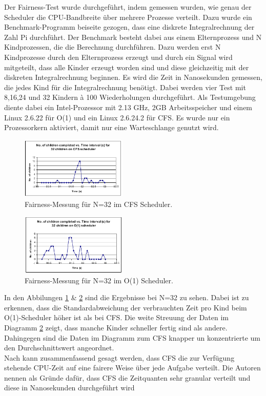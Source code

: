 Der Fairness-Test wurde durchgeführt, indem gemessen wurden, wie genau der Scheduler die CPU-Bandbreite über mehrere Prozesse verteilt. Dazu wurde ein Benchmark-Programm beiseite gezogen, dass eine diskrete Integralrechnung der Zahl Pi durchführt. Der Benchmark besteht dabei aus einem Elternprozess und N Kindprozessen, die die Berechnung durchführen. Dazu werden erst N Kindprozesse durch den Elternprozess erzeugt und durch ein Signal wird mitgeteilt, dass alle Kinder erzeugt worden sind und diese gleichzeitig mit der diskreten Integralrechnung beginnen. Es wird die Zeit in Nanosekunden gemessen, die jedes Kind für die Integralrechnung benötigt. Dabei werden vier Test mit 8,16,24 und 32 Kindern à 100 Wiederholungen durchgeführt. Als Testumgebung diente dabei ein Intel-Prozessor mit 2.13 GHz, 2GB Arbeitsspeicher und einem Linux 2.6.22 für O(1) und ein Linux 2.6.24.2 für CFS. Es wurde nur ein Prozessorkern aktiviert, damit nur eine Warteschlange genutzt wird.  
\begin{figure} [h]
	\centering
	\includegraphics[width=0.45\textwidth]{pictures/fairness_32_cfs.png}
	\caption{Fairness-Messung für N=32 im CFS Scheduler.}
	\label{fig:fair_meas_cfs}
\end{figure}
\begin{figure} [h]
 	\centering
 	\includegraphics[width=0.45\textwidth]{pictures/fairness_32_O1.png}
 	\caption{Fairness-Messung für N=32 im O(1) Scheduler.}
 	\label{fig:fair_meas_o1}
\end{figure}

In den Abbilungen \ref{fig:fair_meas_cfs} \& \ref{fig:fair_meas_o1} sind die Ergebnisse bei N=32 zu sehen. Dabei ist zu erkennen, dass die Standardabweichung der verbrauchten Zeit pro Kind beim O(1)-Scheduler höher ist als bei CFS. Die weite Streuung der Daten im Diagramm \ref{fig:fair_meas_o1} zeigt, dass manche Kinder schneller fertig sind als andere. Dahingegen sind die Daten im Diagramm zum CFS knapper un konzentrierte um den Durchschnittswert angeordnet. \\
Nach \cite{papercomparison} kann zusammenfassend gesagt werden, dass CFS die zur Verfügung stehende CPU-Zeit auf eine fairere Weise über jede Aufgabe verteilt. Die Autoren nennen als Gründe dafür, dass CFS die Zeitquanten sehr granular verteilt und diese in Nanosekunden durchgeführt wird

